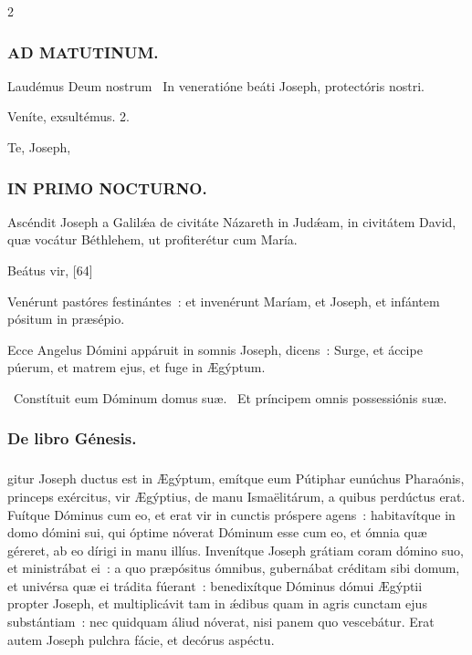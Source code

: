 \documentclass[9pt,twoside]{extarticle}
\begin{document}
\begin{multicols}{2}
{\subsubsection*{\center \textsc{AD MATUTINUM.}}
\begin{tightlist}{}
\item {} Laudémus Deum nostrum \textred{*}~In veneratióne beáti Joseph, protectóris nostri.
\item {} Veníte, exsultémus. 2.
\item {} Te, Joseph, 
\end{tightlist}

\subsubsection*{\center \textsc{IN PRIMO NOCTURNO.}}
\begin{tightlist}{}
\item {} Ascéndit Joseph a Galilǽa de civitáte Názareth in Judǽam, in civitátem David, quæ vocátur Béthlehem, ut profiterétur cum María.
\item {} Beátus vir,  [64]
\item {} Venérunt pastóres festinántes~: et invenérunt Maríam, et Joseph, et infántem pósitum in præsépio.
\item {} Ecce Angelus Dómini appáruit in somnis Joseph, dicens~: Surge, et áccipe púerum, et matrem ejus, et fuge in Ægýptum.
\item {}~Constítuit eum Dóminum domus suæ. ~Et príncipem omnis possessiónis suæ.
\item {}
\end{tightlist}

\subsubsection*{\center De libro Génesis.}
\subsubsection*{\center {}}
gitur Joseph ductus est in Ægýptum, emítque eum Pútiphar eunúchus Pharaónis, princeps exércitus, vir Ægýptius, de manu Ismaëlitárum, a quibus perdúctus erat.
Fuítque Dóminus cum eo, et erat vir in cunctis próspere agens~: habitavítque in domo dómini sui,
qui óptime nóverat Dóminum esse cum eo, et ómnia quæ géreret, ab eo dírigi in manu illíus.
Invenítque Joseph grátiam coram dómino suo, et ministrábat ei~: a quo præpósitus ómnibus, gubernábat créditam sibi domum, et univérsa quæ ei trádita fúerant~:
benedixítque Dóminus dómui Ægýptii propter Joseph, et multiplicávit tam in ǽdibus quam in agris cunctam ejus substántiam~:
nec quidquam áliud nóverat, nisi panem quo vescebátur. Erat autem Joseph pulchra fácie, et decórus aspéctu.

}
\end{multicols}
\end{document}
